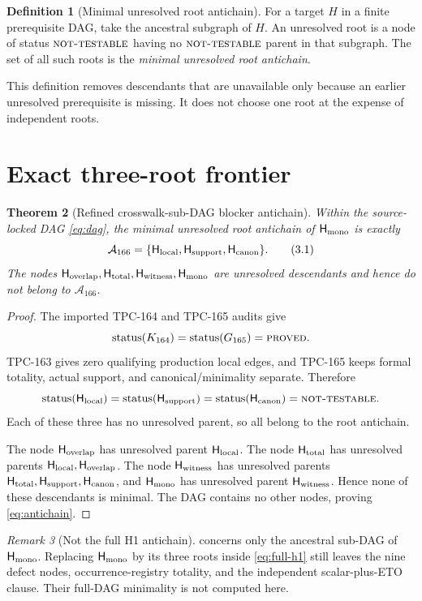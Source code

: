 \documentclass[11pt]{article}
\newtheorem{theorem}{Theorem}[section]
\theoremstyle{definition}
\newtheorem{definition}[theorem]{Definition}
\theoremstyle{remark}
\newtheorem{remark}[theorem]{Remark}
\newcommand{\NT}{\textnormal{\textsc{not-testable}}}
\newcommand{\PROVED}{\textnormal{\textsc{proved}}}
\newcommand{\Hmono}{\mathsf H_{\rm mono}}
\newcommand{\Hlocal}{\mathsf H_{\rm local}}
\newcommand{\Hsupport}{\mathsf H_{\rm support}}
\newcommand{\Hcanon}{\mathsf H_{\rm canon}}
\newcommand{\Hoverlap}{\mathsf H_{\rm overlap}}
\newcommand{\Htotal}{\mathsf H_{\rm total}}
\newcommand{\Hwitness}{\mathsf H_{\rm witness}}
\begin{document}
\begin{definition}[Minimal unresolved root antichain]\label{def:antichain}
For a target \(H\) in a finite prerequisite DAG, take the ancestral
subgraph of \(H\).  An unresolved root is a node of status \(\NT\)
having no \(\NT\) parent in that subgraph.  The set of all such roots
is the \emph{minimal unresolved root antichain}.
\end{definition}

This definition removes descendants that are unavailable only because
an earlier unresolved prerequisite is missing.  It does not choose
one root at the expense of independent roots.

\section{Exact three-root frontier}

\begin{theorem}[Refined crosswalk-sub-DAG blocker antichain]
\label{thm:antichain}
Within the source-locked DAG \eqref{eq:dag}, the minimal unresolved
root antichain of \(\Hmono\) is exactly
\[
 \mathcal A_{166}
 =
 \{\Hlocal,\Hsupport,\Hcanon\}.
 \tag{3.1}\label{eq:antichain}
\]
The nodes \(\Hoverlap,\Htotal,\Hwitness,\Hmono\) are unresolved
descendants and hence do not belong to \(\mathcal A_{166}\).
\end{theorem}

\begin{proof}
The imported TPC-164 and TPC-165 audits give
\[
 \operatorname{status}(K_{164})
 =\operatorname{status}(G_{165})=\PROVED.
\]
TPC-163 gives zero qualifying production local edges, and TPC-165
keeps formal totality, actual support, and canonical/minimality
separate.  Therefore
\[
 \operatorname{status}(\Hlocal)
 =\operatorname{status}(\Hsupport)
 =\operatorname{status}(\Hcanon)=\NT.
\]
Each of these three has no unresolved parent, so all belong to the
root antichain.

The node \(\Hoverlap\) has unresolved parent \(\Hlocal\).
The node \(\Htotal\) has unresolved parents \(\Hlocal,\Hoverlap\).
The node \(\Hwitness\) has unresolved parents
\(\Htotal,\Hsupport,\Hcanon\), and \(\Hmono\) has unresolved parent
\(\Hwitness\).  Hence none of these descendants is minimal.  The DAG
contains no other nodes, proving \eqref{eq:antichain}.
\end{proof}

\begin{remark}[Not the full H1 antichain]\label{rem:not-full}
 concerns only the ancestral sub-DAG of
\(\Hmono\).  Replacing \(\Hmono\) by its three roots inside
\eqref{eq:full-h1} still leaves the nine defect nodes,
occurrence-registry totality, and the independent scalar-plus-ETO
clause.  Their full-DAG minimality is not computed here.
\end{remark}
\end{document}
